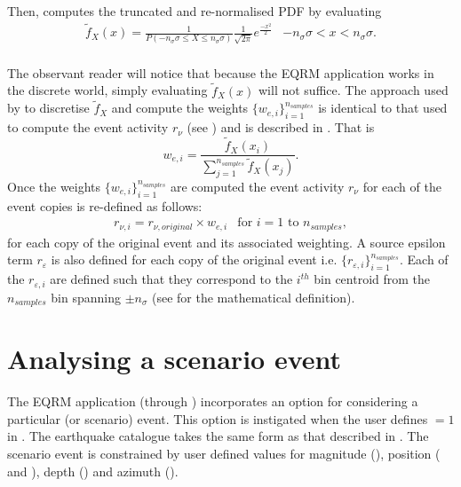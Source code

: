 Then,  computes the truncated and
re-normalised PDF by evaluating
\begin{equation}
\begin{array}{lr}
\tilde{f}_X(x)= \frac{1}{P(-n_\sigma \sigma \leq X \leq n_\sigma
\sigma)}
\frac{1}{\sqrt{2\pi}}e^{ \frac{-x^2}{2}} & -n_\sigma \sigma <x< n_\sigma \sigma. \\
\end{array}
\end{equation}

The observant reader will notice that because the EQRM application
works in the discrete world, simply evaluating $\tilde{f}_X(x)$
will not suffice. The approach used by 
to discretise $\tilde{f}_X$ and compute the weights
$\{w_{e,i}\}_{i=1}^{n_{samples}}$ is identical to that used to
compute the event activity $r_\nu$ (see
) and is described in
. That is
\begin{equation}
w_{e,i} = \frac{\tilde{f}_X(x_i)}{\sum\limits_{j=1}^{n_{samples}}
\tilde{f}_X(x_j)}.
\end{equation}
Once the weights $\{w_{e,i}\}_{i=1}^{n_{samples}}$ are computed
the event activity $r_\nu$ for each of the event copies is
re-defined as follows:
\begin{equation}
\label{source:spawning-activity}
\begin{array}{ll}
r_{\nu,i} = r_{\nu,original} \times w_{e,i} & \textrm{for } i=1
\textrm{ to } n_{samples},
\end{array}
\end{equation}
for each copy of the original event and its associated weighting.
A source epsilon term $r_\varepsilon$ is also defined for each
copy of the original event i.e.
$\{r_{\varepsilon,i}\}_{i=1}^{n_{samples}}$. Each of the
$r_{\varepsilon,i}$ are defined such that they correspond to the
$i^{th}$ bin centroid from the $n_{samples}$ bin spanning $\pm
n_\sigma$ (see  for the mathematical
definition).


\section{Analysing a scenario event}
\label{sec:source-scenario} The EQRM application (through
) incorporates an option for considering
a particular (or scenario) event. This option is instigated when
the user defines $=1$ in
. The earthquake catalogue takes the same
form as that described in . The scenario
event is constrained by user defined values for magnitude
(), position
( and ),
depth () and azimuth
().

